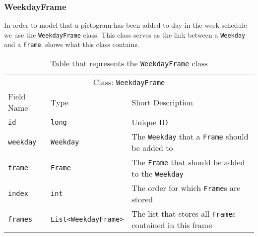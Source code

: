 \subsubsection{WeekdayFrame}
In order to model that a pictogram has been added to day in the week schedule we use the \texttt{WeekdayFrame} class.
This class serves as the link between a \texttt{Weekday} and a \texttt{Frame}.
 shows what this class contains.

\begin{table}[]
\centering
\caption{Table that represents the \texttt{WeekdayFrame} class}
\label{tbl:WeekdayFrame}
\begin{tabular}{lll}
\multicolumn{3}{c}{Class: \texttt{WeekdayFrame}}                                                                                                \\
Field Name          & Type                                            & Short Description                                                       \\
\texttt{id}         & \texttt{long}                                   & Unique ID                                                               \\
\texttt{weekday}    & \texttt{Weekday}                                & The \texttt{Weekday} that a \texttt{Frame} should be added to           \\
\texttt{frame}      & \texttt{Frame}                                  & The \texttt{Frame} that should be added to the \texttt{Weekday}         \\
\texttt{index}      & \texttt{int}                                    & The order for which \texttt{Frame}s are stored                          \\
\texttt{frames}     & \texttt{List\textless WeekdayFrame\textgreater} & The list that stores all \texttt{Frame}s contained in this frame
\end{tabular}
\end{table}

